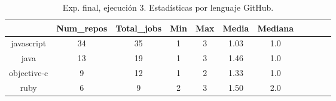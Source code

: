 \begin{table}[h]
  \centering
  \caption{Exp. final, ejecución 3. Estadísticas por lenguaje GitHub.}
  \label{tab:tabla_f3_4}

\begin{footnotesize}
\renewcommand{\arraystretch}{1.5} %
\begin{tabular}{ccccccccccc}
  \hline
  {} &  Num\_repos &  Total\_jobs &  Min &  Max &  Media &  Mediana \\
  \hline
  javascript   &         34 &          35 &    1 &    3 &   1.03 &      1.0 \\
  java         &         13 &          19 &    1 &    3 &   1.46 &      1.0 \\
  objective-c  &          9 &          12 &    1 &    2 &   1.33 &      1.0 \\
  ruby         &          6 &           9 &    2 &    3 &   1.50 &      2.0 \\
 \end{tabular}
\end{footnotesize}

\end{table}

